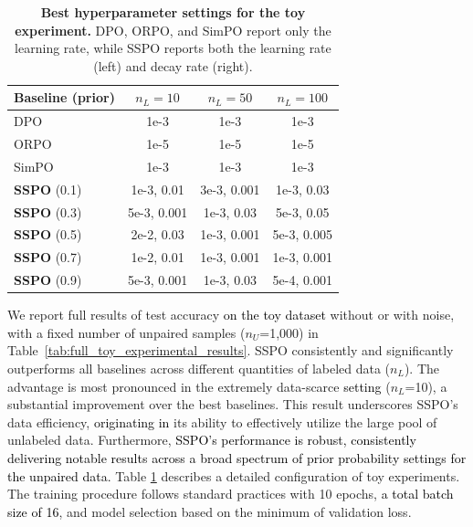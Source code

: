 \documentclass{article} %
\newcommand\fix[1]{\textcolor{black}{#1}}
\newcommand\turnitin[1]{\textcolor{black}{#1}}
\newcommand\rebuttal[1]{\textcolor{black}{#1}}
\begin{document}
\begin{table}
\small
    \centering
    \setlength{\tabcolsep}{0.4mm}
    \caption{\textbf{Best hyperparameter settings for the toy experiment.} DPO, ORPO, and SimPO report only the learning rate, while SSPO reports both the learning rate (left) and decay rate (right).}
    \label{tab:hparam_sspo_toy}
    \begin{tabular}{lccc}
        \toprule
        \textbf{Baseline} (prior) & $n_L=10$ & $n_L=50$ & $n_L=100$ \\
        \midrule
        DPO                     & 1e-3 & 1e-3 & 1e-3 \\
        ORPO                    & 1e-5 & 1e-5 & 1e-5 \\
        SimPO                   & 1e-3 & 1e-3 & 1e-3 \\
        \midrule
        \textbf{SSPO} (0.1)     & 1e-3, 0.01        & 3e-3, 0.001       & 1e-3, 0.03        \\
        \textbf{SSPO} (0.3)     & 5e-3, 0.001       & 1e-3, 0.03        & 5e-3, 0.05        \\
        \textbf{SSPO} (0.5)     & 2e-2, 0.03        & 1e-3, 0.001       & 5e-3, 0.005       \\
        \textbf{SSPO} (0.7)     & 1e-2, 0.01        & 1e-3, 0.001       & 1e-3, 0.001       \\
        \textbf{SSPO} (0.9)     & 5e-3, 0.001       & 1e-3, 0.03        & 5e-4, 0.001       \\
        \bottomrule
    \end{tabular}
    \vspace{-30pt}
\end{table}

We report full results of test accuracy \rebuttal{on the toy dataset} without or with noise, with a fixed number of unpaired samples ($n_U$=1,000) in Table~\ref{tab:full_toy_experimental_results}. SSPO consistently and significantly outperforms all baselines across different quantities of labeled data ($n_L$). The advantage is most pronounced in the extremely data-scarce \fix{setting} ($n_L$=10), a substantial improvement over the best baselines. This result underscores SSPO's data efficiency, \turnitin{originating in} its ability to effectively utilize the large pool of unlabeled data. Furthermore, \turnitin{SSPO's performance is robust, consistently delivering notable results across a broad spectrum of prior probability settings for the unpaired data.} Table \ref{tab:hparam_sspo_toy} describes a detailed configuration of toy experiments. The training procedure follows standard practices with 10 epochs, \rebuttal{a total batch size of 16}, and model selection based on the minimum of validation loss. 
\end{document}
